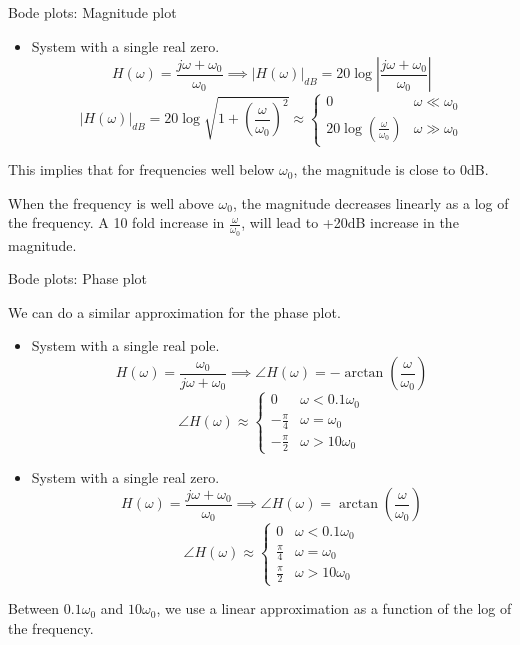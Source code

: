 \documentclass{beamer}
\begin{document}
\begin{frame}{Bode plots: Magnitude plot}

\begin{itemize}
\item System with a single real zero.
\[ H(\omega) = \frac{j\omega + \omega_0}{\omega_0} \implies \left|H(\omega)\right|_{dB}=20\log\left|\frac{j\omega+\omega_0}{\omega_0}\right|\]
\[ \left|H(\omega)\right|_{dB}=20\log\sqrt{1 + \left(\frac{\omega}{\omega_0}\right)^2} \approx \begin{cases}
0 & \omega \ll \omega_0\\
20\log\left(\frac{\omega}{\omega_0}\right)& \omega \gg \omega_0
\end{cases} \]
\end{itemize}
This implies that for frequencies well below $\omega_0$, the magnitude is close to 0dB.

When the frequency is well above $\omega_0$, the magnitude decreases linearly as a log of the frequency. A 10 fold increase in $\frac{\omega}{\omega_0}$, will lead to +20dB increase in the magnitude.

\end{frame}

\begin{frame}{Bode plots: Phase plot}
\begin{small}
We can do a similar approximation for the phase plot.
\begin{itemize}
\item System with a single real pole.
\[ H(\omega) = \frac{\omega_0}{j\omega + \omega_0} \implies \angle H(\omega)=-\arctan \left(\frac{\omega}{\omega_0}\right)\]
\[ \angle H(\omega) \approx \begin{cases}
0 & \omega < 0.1\omega_0\\
-\frac{\pi}{4} & \omega = \omega_0\\
-\frac{\pi}{2} & \omega > 10\omega_0 
\end{cases} \]
\item System with a single real zero.
\[ H(\omega) = \frac{j\omega + \omega_0}{\omega_0} \implies \angle H(\omega)=\arctan \left(\frac{\omega}{\omega_0}\right)\]
\[ \angle H(\omega) \approx \begin{cases}
0 & \omega < 0.1\omega_0\\
\frac{\pi}{4} & \omega = \omega_0\\
\frac{\pi}{2} & \omega > 10\omega_0 
\end{cases} \]
\end{itemize}
Between $0.1\omega_0$ and $10\omega_0$, we use a linear approximation as a function of the log of the frequency.
\end{small}
\end{frame}
\end{document}
